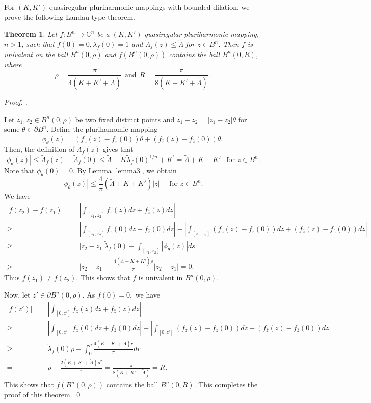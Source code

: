 \documentclass[a4paper,12pt,reqno]{amsart}
\theoremstyle{plain}
\newtheorem{thm}{Theorem}
\theoremstyle{definition}
\newenvironment{pf}[1][]{%
	\vskip 3mm
	\noindent
	\ifthenelse{\equal{#1}{}}%
	{{\slshape Proof. }}%
	{{\slshape #1.} }%
}%
{\qed\bigskip}
\newcommand{\IC}{{\mathbb C}}
\numberwithin{equation}{section}
\begin{document}
For $(K,K')$-quasiregular pluriharmonic mappings with bounded dilation, we prove the following Landau-type theorem.
\begin{thm}\label{Rohi-Vasu-P2-Theorem-003}
 Let $f: B^n \to \IC^n$ be a $(K,K')$-quasiregular pluriharmonic mapping, $n>1$, such that $f(0)=0, \widetilde{\lambda}_f(0)=1$ and $\widetilde{\Lambda}_f(z)\leq \widetilde{\Lambda}$ for $z \in B^n$. Then $f$ is univalent on the ball $B^n(0,\rho)$ and $f(B^n(0,\rho))$ contains the ball $B^n(0, R)$, where $$\rho=\frac{\pi}{4(K+K'+\widetilde{\Lambda})} \ \  \text{and}\ \ R=\frac{\pi}{8(K+K'+\widetilde{\Lambda})}.$$
\end{thm}
\begin{pf}
 Let $z_1, z_2 \in B^n(0, \rho)$ be two fixed distinct points and
$z_1-z_2=|z_1-z_2| \theta$ for some $\theta\in \partial B^n$. Define the plurihamomic mapping
$$
\phi_\theta(z)=\left(f_z(z)-f_z(0)\right) \theta+\left(f_{\bar{z}}(z)-f_{\bar{z}}(0)\right) \bar{\theta}.
$$
Then, the definition of $\widetilde{\Lambda}_f(z)$ gives that
$$
|\phi_\theta(z)| \leq \widetilde{\Lambda}_f(z)+\widetilde{\Lambda}_f(0) \leq \widetilde{\Lambda}+K \widetilde{\lambda}_f(0)^{1 / n}+K^{\prime}=\widetilde{\Lambda}+K+K'
\ \ \text { for } z \in B^n. 
$$
Note that $\phi_\theta(0)=0$. By Lemma \ref{lemma3}, we obtain
$$
|\phi_\theta(z)| \leq \frac{4}{\pi}\left(\widetilde{\Lambda}+K+K' \right)|z| \quad \text { for } z \in B^n.
$$
We have
$$
\begin{aligned}
|f(z_2)-f(z_1)| =&\left|\int_{[z_1,z_2]}  f_z(z)dz+f_{\bar{z}}(z) d\bar{z} \right|\\ \geq & \left|\int_{[z_1, z_2]} f_z(0) d z+f_{\bar{z}}(0) d \bar{z}\right|
-\left|\int_{[z_1,z_2]}\left(f_z(z)-f_z(0)\right) d z+\left(f_{\bar{z}}(z)-f_{\bar{z}}(0)\right) d \bar{z}\right| \\
\geq & |z_2-z_1| \widetilde{\lambda}_f(0)-\int_{[z_1,z_2]}|\phi_\theta(z)| d s \\
> & |z_2-z_1|- \frac{4\left(\widetilde{\Lambda}+K+K'\right) \rho}{\pi}|z_2-z_1| =0.
\end{aligned}
$$
Thus $f(z_1)\neq f(z_2)$. This shows that $f$ is univalent in $B^n(0,\rho)$.

\hspace{-5mm}Now, let $z'\in \partial B^n(0,\rho)$. As $f(0)=0,$ we have
$$
\begin{aligned}
|f(z')|= & \left|\int_{[0,z']}f_z(z)dz+f_{\bar{z}}(z)d\bar{z}\right|\\
\geq & \left|\int_{[0, z']} f_z(0) d z+f_{\bar{z}}(0) d \bar{z}\right|
-\left|\int_{[0,z']}\left(f_z(z)-f_z(0)\right) d z+\left(f_{\bar{z}}(z)-f_{\bar{z}}(0)\right) d \bar{z}\right|\\
\geq & \widetilde{\lambda}_f(0) \rho- \int_{0}^\rho \frac{4(K+K'+\widetilde{\Lambda})r}{\pi} dr\\
= & \rho - \frac{2(K+K'+\widetilde{\Lambda})\rho^2}{\pi}=\frac{\pi}{8(K+K'+\widetilde{\Lambda})}=R.
\end{aligned}
$$
This shows that $f(B^n(0,\rho))$ contains the ball $B^n(0,R)$. This completes the proof of this theorem.
\end{pf}
\end{document}

